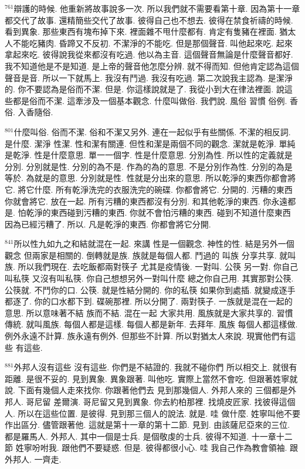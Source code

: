 \documentclass{book}
\begin{document}
$^{761}$辯護的時候.
他重新將故事說多一次.
所以我們就不需要看第十章.
因為第十一章都交代了故事.
還精簡些交代了故事.
彼得自己也不想去.
彼得在禁食祈禱的時候.
看到異象.
那些東西有塊布掉下來.
裡面雜不甩什麼都有.
肯定有隻豬在裡面.
猶太人不能吃豬肉.
昏蹄又不反初.
不潔淨的不能吃.
但是那個聲音.
叫他起來吃.
起來拿起來吃.
彼得說我從來都沒有吃過.
他以為主音.
這個聲音無論是什麼聲音都好.
我不知道他是不是知道.
是上帝的聲音他怎麼分辨.
就不得而知.
但他肯定認為這個聲音是音.
所以一下就馬上.
我沒有鬥過.
我沒有吃過.
第二次說我主認為.
是潔淨的.
你不要認為是俗而不潔.
但是.
你這樣說就是了.
我從小到大在律法裡面.
說這些都是俗而不潔.
這牽涉及一個基本觀念.
什麼叫做俗.
我們說.
風俗 習慣 俗例.
香俗.
入香隨俗.

$^{801}$什麼叫俗.
俗而不潔.
俗和不潔又另外.
連在一起似乎有些關係.
不潔的相反詞.
是什麼.
潔淨 性潔.
性和潔有關連.
但性和潔是兩個不同的觀念.
潔就是乾淨.
單純是乾淨.
性是什麼意思.
單一一個字.
性是什麼意思.
分別為性.
所以性的定義就是分別.
分別就是性.
分別的為不是.
作為的為的意思.
不是分別作為性.
分別的為是等於.
為就是的意思.
分別就是性.
性就是分出來的意思.
所以乾淨的東西你都會將它.
將它什麼.
所有乾淨洗完的衣服洗完的碗碟.
你都會將它.
分開的.
污糟的東西你就會將它.
放在一起.
所有污糟的東西都沒有分別.
和其他乾淨的東西.
你永遠都是.
怕乾淨的東西碰到污糟的東西.
你就不會怕污糟的東西.
碰到不知道什麼東西 因為已經污糟了.
所以.
凡是乾淨的東西.
你都會將它分開.

$^{841}$所以性九如九之和結就混在一起.
來講 性是一個觀念.
神性的性.
結是另外一個觀念 但兩家是相關的.
倒轉就是族.
族就是每個人都.
鬥過的 叫族 分享共享.
就叫族.
所以我們現在.
去吃飯都兩對筷子 尤其是疫情後.
一對叫.
公筷 另一對.
你自己叫私筷 又沒有叫私筷.
你自己想想另外一對叫什麼 總之你自己用.
其實那對公筷.
公筷就.
不鬥你的口.
公筷.
就是性結分開的.
你的私筷 如果你到處插.
就變成逐手都逐了.
你的口水都下到.
碟碗那裡.
所以分開了.
兩對筷子.
一族就是混在一起的意思.
所以意味著不結 族而不結.
混在一起 大家共用.
風族就是大家共享的.
習慣 傳統.
就叫風族.
每個人都是這樣.
每個人都是新年.
去拜年.
風族 每個人都這樣做.
例外永遠不計算.
族永遠有例外.
但那些不計算.
所以對猶太人來說.
現實他們有這些 有這些.

$^{881}$外邦人沒有這些 沒有這些.
你們是不結證的.
我就不碰你們 所以相交上.
就很有距離.
是很不妥的.
見到異象.
異象跟著.
叫他吃.
實際上當然不會吃.
但跟著姓寧就說.
下面有幾個人走來找你.
你跟著他們去 見到那幾個人.
外邦人來的 三個都是外邦人.
哥尼留 差爾演.
哥尼留又見到異象.
你去約柏那裡.
找燒皮匠家.
找彼得這個人.
所以在這些位置.
是彼得.
見到那三個人的說法.
就是.
哇 做什麼.
姓寧叫他不要作出區分.
儘管跟著他.
這就是第十一章的第十二節.
見到.
由該薩尼亞來的三位.
都是羅馬人.
外邦人.
其中一個是士兵.
是個敬虔的士兵.
彼得不知道.
十一章十二節 姓寧吩咐我.
跟他們不要疑惑.
但是.
彼得都很小心.
哇 我自己作為教會領袖.
跟外邦人.
一齊走.
\end{document}
